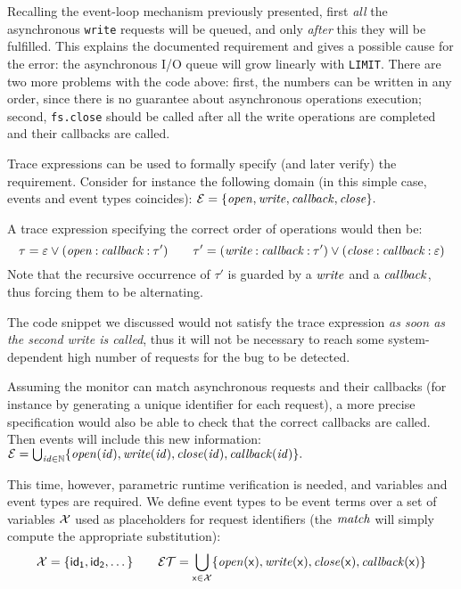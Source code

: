 Recalling the event-loop mechanism previously presented, first \emph{all} the asynchronous \lstinline{write} requests will be queued, and only \emph{after} this they will be fulfilled.
This explains the documented requirement and gives a possible cause for the error: the asynchronous I/O queue will grow linearly with \lstinline{LIMIT}.
There are two more problems with the code above: first, the numbers can be written in any order, since there is no guarantee about asynchronous operations execution; second, \lstinline{fs.close} should be called after all the write operations are completed and their callbacks are called.

Trace expressions can be used to formally specify (and later verify) the requirement.
Consider for instance the following domain (in this simple case, events and event types coincides):
$ \mathcal{E} = \{ \mathit{open}, \mathit{write}, \mathit{callback}, \mathit{close} \}.$

A trace expression specifying the correct order of operations would then be:
$$
\tau = \varepsilon \mathbin{\vee} (\mathit{open} \mathbin{:} \mathit{callback} \mathbin{:} \tau')\qquad
\tau' = (\mathit{write} \mathbin{:} \mathit{callback} \mathbin{:} \tau') \mathbin{\vee} (\mathit{close} \mathbin{:} \mathit{callback} \mathbin{:} \varepsilon)
$$
Note that the recursive occurrence of \(\tau'\) is guarded by a \(\mathit{write}\) and a \(\mathit{callback}\), thus forcing them to be alternating.

The code snippet we discussed would not satisfy the trace expression \emph{as soon as the second write is called}, thus it will not be necessary to reach some system-dependent high number of requests for the bug to be detected.

Assuming the monitor can match asynchronous requests and their callbacks (for instance by generating a unique identifier for each request), a more precise specification would also be able to check that the correct callbacks are called.
Then events will include this new information:
$\mathcal{E} = \bigcup_{\mathit{id} \in \mathbb{N}} \{\mathit{open}(\mathit{id}), \mathit{write}(\mathit{id}), \mathit{close}(\mathit{id}), \mathit{callback}(\mathit{id}) \}.$

This time, however, parametric runtime verification is needed, and variables and event types are required.
We define event types to be event terms over a set of variables \(\mathcal{X}\) used as placeholders for request identifiers (the \(\mathit{match}\) will simply compute the appropriate substitution):
$$
\mathcal{X} = \{ \mathsf{id_1}, \mathsf{id_2}, \dotsc \}\qquad
\mathcal{ET} = \bigcup_{\mathsf{x} \in \mathcal{X}} \{\mathit{open}(\mathsf{x}), \mathit{write}(\mathsf{x}), \mathit{close}(\mathsf{x}), \mathit{callback}(\mathsf{x}) \}
$$

